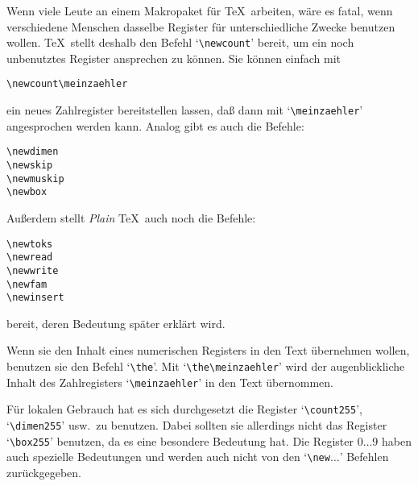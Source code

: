 Wenn viele Leute an einem 
Makropaket f\"ur \TeX\ arbeiten, w\"are es
fatal, wenn verschiedene Menschen dasselbe Register f\"ur
unterschiedliche Zwecke benutzen wollen. \TeX\ stellt deshalb den
Befehl 
`\verb|\newcount|' bereit, um ein noch unbenutztes Register
ansprechen zu k\"onnen. Sie k\"onnen einfach mit
\begin{verbatim}
\newcount\meinzaehler
\end{verbatim}
ein 
neues Zahlregister bereitstellen lassen, da\ss{} dann mit
`\verb|\meinzaehler|' angesprochen werden kann. Analog gibt es auch
die Befehle:
\begin{verbatim}
\newdimen
\newskip
\newmuskip
\newbox
\end{verbatim}
Au\ss{}erdem stellt {\em Plain} \TeX\ auch noch die Befehle:
\begin{verbatim}
\newtoks
\newread
\newwrite
\newfam
\newinsert
\end{verbatim}
bereit, deren Bedeutung sp\"ater erkl\"art wird.

Wenn sie den Inhalt eines numerischen Registers in den Text \"ubernehmen
wollen, benutzen sie den Befehl 
`\verb|\the|'. Mit
`\verb|\the\meinzaehler|' wird der augenblickliche Inhalt des
Zahlregisters `\verb|\meinzaehler|' in den Text \"ubernommen.

F\"ur lokalen Gebrauch hat es sich durchgesetzt die Register
`\verb|\count255|', `\verb|\dimen255|' usw.\ zu benutzen. Dabei
sollten sie allerdings nicht das Register 
`\verb|\box255|' benutzen,
da es eine besondere Bedeutung hat. Die Register $0\ldots9$ haben auch
spezielle Bedeutungen und werden auch nicht von den
`\verb|\new|$\ldots$' Befehlen zur\"uckgegeben.

